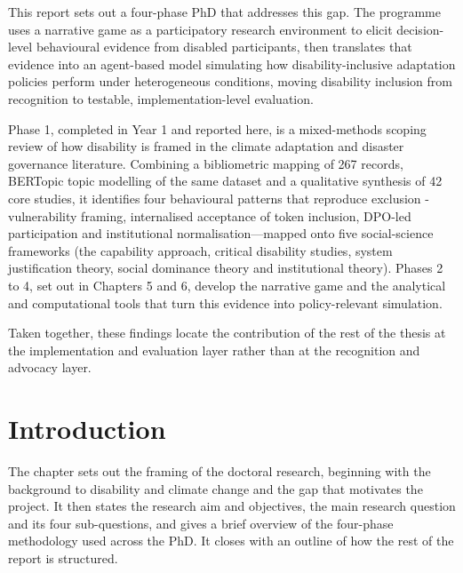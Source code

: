 \documentclass[12pt,a4paper]{report}
\begin{document}
This report sets out a four-phase PhD that addresses this gap. The programme uses a narrative game as a participatory research environment to elicit decision-level behavioural evidence from disabled participants, then translates that evidence into an agent-based model simulating how disability-inclusive adaptation policies perform under heterogeneous conditions, moving disability inclusion from recognition to testable, implementation-level evaluation.

Phase 1, completed in Year 1 and reported here, is a mixed-methods scoping review of how disability is framed in the climate adaptation and disaster governance literature. Combining a bibliometric mapping of 267 records, BERTopic topic modelling of the same dataset and a qualitative synthesis of 42 core studies, it identifies four behavioural patterns that reproduce exclusion - vulnerability framing, internalised acceptance of token inclusion, DPO-led participation and institutional normalisation—mapped onto five social-science frameworks (the capability approach, critical disability studies, system justification theory, social dominance theory and institutional theory). Phases 2 to 4, set out in Chapters 5 and 6, develop the narrative game and the analytical and computational tools that turn this evidence into policy-relevant simulation.

Taken together, these findings locate the contribution of the rest of the thesis at the implementation and evaluation layer
rather than at the recognition and advocacy layer.


\clearpage
\chapter{Introduction}
\vspace*{-1cm}
The chapter sets out the framing of the doctoral research, beginning with the background to disability and climate change and the gap that motivates the project. It then states the research aim and objectives, the main research question and its four sub-questions, and gives a brief overview of the four-phase methodology used across the PhD. It closes with an outline of how the rest of the report is structured.
\clearpage
\end{document}
